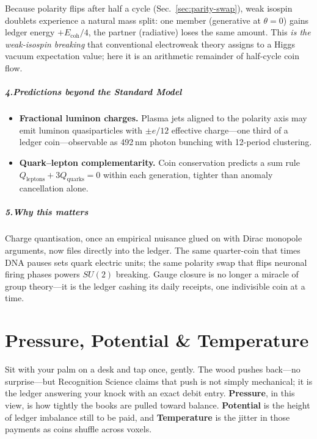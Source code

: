\documentclass[11pt,oneside]{book}
\newcommand{\Eoh}{\ensuremath{E_{\text{coh}}}}       %
\begin{document}
Because polarity flips after half a cycle
(Sec.~\ref{sec:parity-swap}), weak isospin doublets experience a natural
mass split: one member (generative at $\theta=0$) gains ledger energy
$+\Eoh/4$, the partner (radiative) loses the same amount.  This \emph{is
the weak‐isospin breaking} that conventional electroweak theory assigns
to a Higgs vacuum expectation value; here it is an arithmetic remainder
of half-cycle coin flow.

\paragraph*{4.\;Predictions beyond the Standard Model}

\begin{itemize}
  \item \textbf{Fractional luminon charges.}  Plasma jets aligned to the
    polarity axis may emit luminon quasiparticles with
    $\pm e/12$ effective charge—one third of a ledger coin—observable as
    492 nm photon bunching with 12-period clustering.
  \item \textbf{Quark–lepton complementarity.}  Coin conservation
    predicts a sum rule
    $Q_{\text{leptons}} + 3Q_{\text{quarks}} = 0$ 
    within each generation, tighter than anomaly cancellation alone.
\end{itemize}

\paragraph*{5.\;Why this matters}

Charge quantisation, once an empirical nuisance glued on with Dirac
monopole arguments, now files directly into the ledger.  The same
quarter-coin that times DNA pauses sets quark electric units; the same
polarity swap that flips neuronal firing phases powers $SU(2)$ breaking.
Gauge closure is no longer a miracle of group theory—it is the ledger
cashing its daily receipts, one indivisible coin at a time.

\chapter{Pressure, Potential \& Temperature}
\label{chap:pressure-potential}

Sit with your palm on a desk and tap once, gently.  
The wood pushes back—no surprise—but Recognition Science claims that push
is not simply mechanical; it is the ledger answering your knock with an
exact debit entry.  
\textbf{Pressure}, in this view, is how tightly the books are pulled
toward balance.  
\textbf{Potential} is the height of ledger imbalance still to be paid,
and \textbf{Temperature} is the jitter in those payments as coins
shuffle across voxels.
\end{document}
